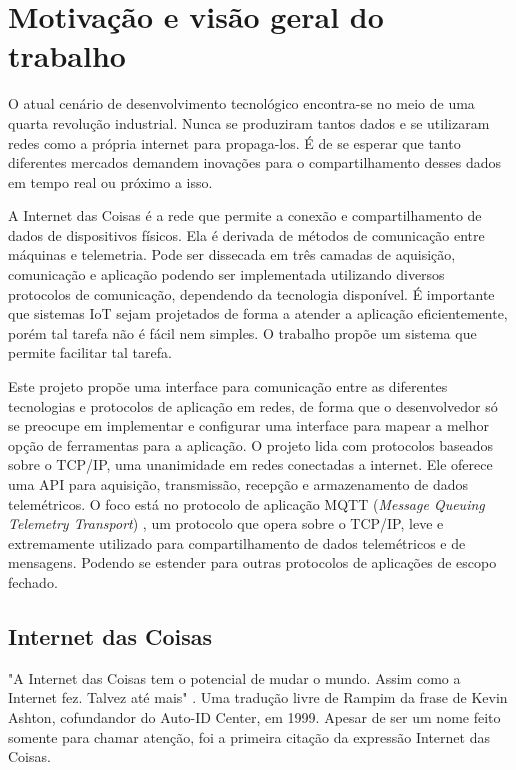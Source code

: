 \chapter{Motivação e visão geral do trabalho}
\label{chapter:intro}

O atual cenário de desenvolvimento tecnológico encontra-se no meio de uma quarta revolução industrial. Nunca se produziram tantos dados e se utilizaram redes como a própria internet para propaga-los. É de se esperar que tanto diferentes mercados demandem inovações para o compartilhamento desses dados em tempo real ou próximo a isso.

A Internet das Coisas é a rede que permite a conexão e compartilhamento de dados  de dispositivos físicos. Ela é derivada de métodos de comunicação entre máquinas e telemetria. Pode ser dissecada em três camadas de aquisição, comunicação e aplicação  podendo ser implementada utilizando diversos protocolos de comunicação, dependendo da tecnologia disponível. É importante que sistemas IoT sejam projetados de forma a atender a aplicação eficientemente, porém tal tarefa não é fácil nem simples. O trabalho propõe um sistema que permite facilitar tal tarefa.

Este projeto propõe uma interface para comunicação entre as diferentes tecnologias e protocolos de aplicação em redes, de forma que o desenvolvedor só se preocupe em  implementar e configurar uma interface para mapear a melhor opção de ferramentas para a aplicação. O projeto lida com protocolos baseados sobre o TCP/IP, uma unanimidade em redes conectadas a internet. Ele oferece uma API para aquisição, transmissão, recepção e armazenamento de dados telemétricos. O foco está no protocolo de aplicação MQTT (\textit{Message Queuing Telemetry Transport}) \cite{mqtt}, um protocolo que opera sobre o TCP/IP, leve e extremamente utilizado para compartilhamento  de dados telemétricos e de mensagens. Podendo se estender para outras protocolos de aplicações de escopo fechado.

\section{Internet das Coisas}
\label{section:iot}

"A Internet das Coisas tem o potencial de mudar o mundo. Assim como a Internet fez. Talvez até mais" \cite{ashton:iot}. Uma tradução livre de Rampim \cite{Rampim:iot} da frase de Kevin Ashton, cofundandor do Auto-ID Center, em 1999. Apesar de ser um nome feito somente para chamar atenção, foi a primeira citação da expressão Internet das Coisas.

